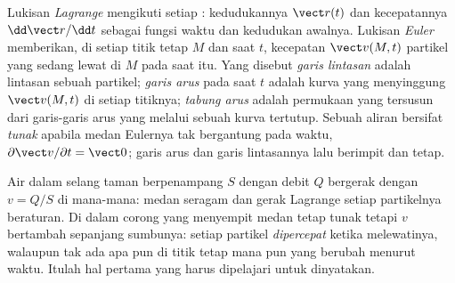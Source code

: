 \begin{definition}\label{def:b2:fluid-kinematics:euler}
Lukisan \emph{Lagrange} mengikuti setiap : kedudukannya
$\vect r(t)$ dan kecepatannya $\dd\vect r/\dd t$ sebagai fungsi waktu dan
kedudukan awalnya. Lukisan \emph{Euler} memberikan, di setiap titik tetap
$M$ dan saat $t$, kecepatan $\vect v(M, t)$ partikel yang sedang lewat di
$M$ pada saat itu. Yang disebut \emph{garis lintasan} adalah lintasan
sebuah partikel; \emph{garis arus} pada saat $t$ adalah kurva yang
menyinggung $\vect v(M, t)$ di setiap titiknya; \emph{tabung arus} adalah
permukaan yang tersusun dari garis-garis arus yang melalui sebuah kurva
tertutup. Sebuah aliran bersifat \emph{tunak} apabila medan Eulernya tak
bergantung pada waktu, $\partial\vect v/\partial t = \vect 0$; garis arus
dan garis lintasannya lalu berimpit dan tetap.
\end{definition}

\begin{example}\label{ex:b2:fluid-kinematics:hose}
Air dalam selang taman berpenampang $S$ dengan debit $Q$ bergerak dengan
$v = Q/S$ di mana-mana: medan  seragam dan gerak Lagrange setiap
partikelnya beraturan. Di dalam corong yang menyempit medan 
tetap tunak tetapi $v$ bertambah sepanjang sumbunya: setiap partikel
\emph{dipercepat} ketika melewatinya, walaupun tak ada apa pun di titik
tetap mana pun yang berubah menurut waktu. Itulah hal pertama yang harus
dipelajari  untuk dinyatakan.
\end{example}

